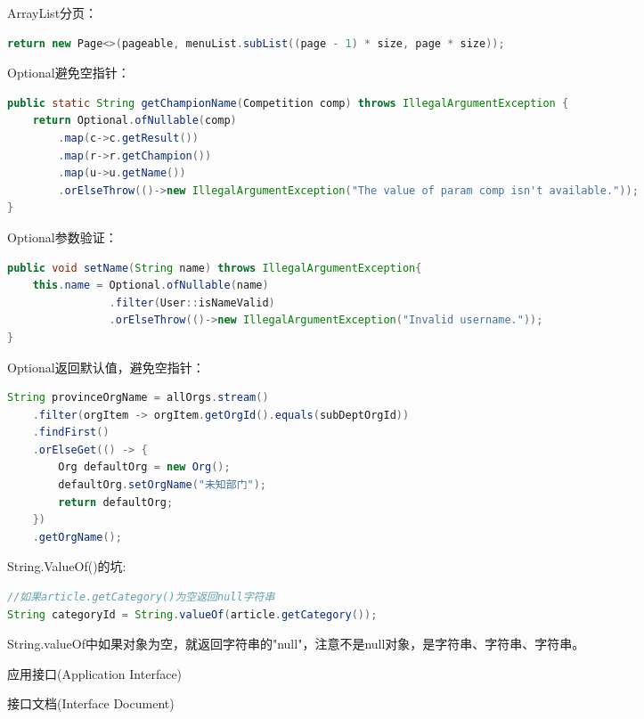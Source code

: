 \documentclass[12pt]{book}
\makeatletter
\numberwithin{dummy}{section}
\theoremstyle{ocrenumbox}
\theoremstyle{blacknumex}
\theoremstyle{blacknumbox}
\theoremstyle{ocrenum}
\renewcommand{\section}{\@startsection{section}{1}{\z@}
	{-4ex \@plus -1ex \@minus -.4ex}
	{1ex \@plus.2ex }
	{\normalfont\large\sffamily\bfseries}}
\renewcommand{\subsection}{\@startsection {subsection}{2}{\z@}
	{-3ex \@plus -0.1ex \@minus -.4ex}
	{0.5ex \@plus.2ex }
	{\normalfont\sffamily\bfseries}}
\makeatother
\begin{document}
ArrayList分页：

\begin{lstlisting}[language=Java]
return new Page<>(pageable, menuList.subList((page - 1) * size, page * size));
\end{lstlisting}

Optional避免空指针：

\begin{lstlisting}[language=Java]
public static String getChampionName(Competition comp) throws IllegalArgumentException {
	return Optional.ofNullable(comp)
		.map(c->c.getResult())
		.map(r->r.getChampion())
		.map(u->u.getName())
		.orElseThrow(()->new IllegalArgumentException("The value of param comp isn't available."));
}
\end{lstlisting}

Optional参数验证：

\begin{lstlisting}[language=Java]
public void setName(String name) throws IllegalArgumentException{
	this.name = Optional.ofNullable(name)
				.filter(User::isNameValid)
				.orElseThrow(()->new IllegalArgumentException("Invalid username."));
}
\end{lstlisting}

Optional返回默认值，避免空指针：

\begin{lstlisting}[language=Java]
String provinceOrgName = allOrgs.stream()
	.filter(orgItem -> orgItem.getOrgId().equals(subDeptOrgId))
	.findFirst()
	.orElseGet(() -> {
		Org defaultOrg = new Org();
		defaultOrg.setOrgName("未知部门");
		return defaultOrg;
	})
	.getOrgName();
\end{lstlisting}

String.ValueOf()的坑:

\begin{lstlisting}[language=Java]
//如果article.getCategory()为空返回null字符串
String categoryId = String.valueOf(article.getCategory());
\end{lstlisting}

String.valueOf中如果对象为空，就返回字符串的"null"，注意不是null对象，是字符串、字符串、字符串。

\section{应用接口(Application Interface)}

\subsection{接口文档(Interface Document)}
\end{document}
